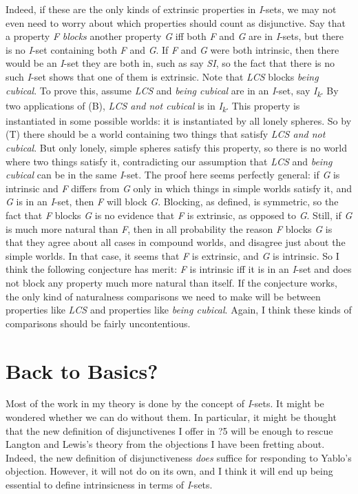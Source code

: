 Indeed, if these are the only kinds of extrinsic properties in \textit{I}\nobreakdash-sets, we may not even need to worry about which properties should count as disjunctive. Say that a property \textit{F} \textit{blocks} another property \textit{G} iff both \textit{F} and \textit{G} are in \textit{I}\nobreakdash-sets, but there is no \textit{I}\nobreakdash-set containing both \textit{F} and \textit{G}. If \textit{F} and \textit{G} were both intrinsic, then there would be an \textit{I}\nobreakdash-set they are both in, such as say \textit{SI}, so the fact that there is no such \textit{I}\nobreakdash-set shows that one of them is extrinsic. Note that \textit{LCS} blocks \textit{being cubical}. To prove this, assume \textit{LCS }and \textit{being cubical} are in an \textit{I}\nobreakdash-set, say \textit{I}\textit{\textsubscript{k}}. By two applications of (B), \textit{LCS and not cubical} is in \textit{I}\textit{\textsubscript{k}}. This property is instantiated in some possible worlds: it is instantiated by all lonely spheres. So by (T) there should be a world containing two things that satisfy \textit{LCS and not cubical}. But only lonely, simple spheres satisfy this property, so there is no world where two things satisfy it, contradicting our assumption that \textit{LCS} and \textit{being cubical} can be in the same \textit{I}\nobreakdash-set. The proof here seems perfectly general: if \textit{G} is intrinsic and \textit{F} differs from \textit{G} only in which things in simple worlds satisfy it, and \textit{G} is in an \textit{I}\nobreakdash-set, then \textit{F} will block \textit{G}. Blocking, as defined, is symmetric, so the fact that \textit{F} blocks \textit{G} is no evidence that \textit{F} is extrinsic, as opposed to \textit{G}. Still, if \textit{G} is much more natural than \textit{F}, then in all probability the reason \textit{F} blocks \textit{G} is that they agree about all cases in compound worlds, and disagree just about the simple worlds. In that case, it seems that \textit{F} is extrinsic, and \textit{G} is intrinsic. So I think the following conjecture has merit: \textit{F} is intrinsic iff it is in an \textit{I}\nobreakdash-set and does not block any property much more natural than itself. If the conjecture works, the only kind of naturalness comparisons we need to make will be between properties like \textit{LCS} and properties like \textit{being cubical}. Again, I think these kinds of comparisons should be fairly uncontentious.


\section{Back to Basics?}
Most of the work in my theory is done by the concept of \textit{I}\nobreakdash-sets. It might be wondered whether we can do without them. In particular, it might be thought that the new definition of disjunctivenes I offer in ?5 will be enough to rescue Langton and Lewis's theory from the objections I have been fretting about. Indeed, the new definition of disjunctiveness \textit{does} suffice for responding to Yablo's objection. However, it will not do on its own, and I think it will end up being essential to define intrinsicness in terms of \textit{I}\nobreakdash-sets.

